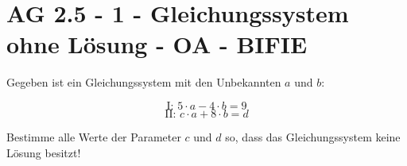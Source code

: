 \section{AG 2.5 - 1 - Gleichungssystem ohne Lösung - OA - BIFIE}

\begin{beispiel}[AG 2.5]{1} %
			Gegeben ist ein Gleichungssystem mit den Unbekannten $a$ und $b$:
				
			
				\[\text{I: } 5 \cdot a - 4 \cdot b= 9 \]
					\[\text{II: } c \cdot a + 8\cdot b = d \]			
				
\leer


Bestimme alle Werte der Parameter $c$ und $d$ so, dass das Gleichungssystem keine Lösung besitzt!

\end{beispiel}